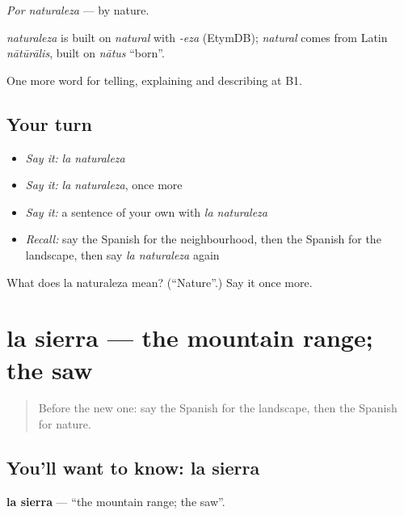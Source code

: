 \emph{Por naturaleza} — by nature.

\begin{cousinweb}
\emph{naturaleza} is built on \emph{natural} with \emph{-eza} (EtymDB); \emph{natural} comes from Latin \emph{nātūrālis}, built on \emph{nātus} \textquotedblleft{}born\textquotedblright{}.
\end{cousinweb}

\begin{grammarlens}[title={What you've built}]
One more word for telling, explaining and describing at B1.
\end{grammarlens}

\subsection*{Your turn}
\begin{itemize}
\raggedright
  \item \emph{Say it:} \emph{la naturaleza}
  \item \emph{Say it:} \emph{la naturaleza}, once more
  \item \emph{Say it:} a sentence of your own with \emph{la naturaleza}
  \item \emph{Recall:} say the Spanish for the neighbourhood, then the Spanish for the landscape, then say \emph{la naturaleza} again
\end{itemize}

\begin{tcolorbox}[breakable,colback=teal!4,colframe=teal!35!black,title={Before you move on}]
What does la naturaleza mean? (\textquotedblleft{}Nature\textquotedblright{}.) Say it once more.
\end{tcolorbox}
\section[la sierra]{la sierra — the mountain range; the saw}

\label{lesson:ES-C685-sierra}



\begin{quote}
Before the new one: say the Spanish for the landscape, then the Spanish for nature.
\end{quote}

\subsection*{You'll want to know: la sierra}
\textbf{la sierra} — \textquotedblleft{}the mountain range; the saw\textquotedblright{}.

